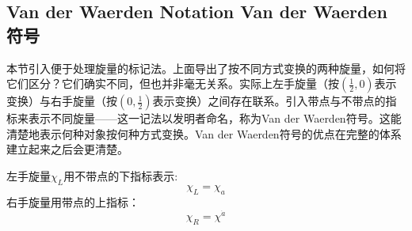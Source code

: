 \subsection[Van der Waerden 符号]{Van der Waerden Notation \quad Van der Waerden 符号}
\label{sec3.7.7}
本节引入便于处理旋量的标记法。上面导出了按不同方式变换的两种旋量，如何将它们区分？它们确实不同，但也并非毫无关系。实际上左手旋量（按$(\frac{1}{2}, 0)$表示变换）与右手旋量（按$(0, \frac{1}{2})$表示变换）之间存在联系。引入带点与不带点的指标来表示不同旋量——这一记法以发明者命名，称为Van der Waerden符号。这能清楚地表示何种对象按何种方式变换。Van der Waerden符号的优点在完整的体系建立起来之后会更清楚。

左手旋量$\chi_L$用不带点的下指标表示:
\begin{equation}
\label{equ3.188}
	\chi_L = \chi_a
\end{equation}
右手旋量用带点的上指标：
\begin{equation}
\label{equ3.189}
	\chi_R = \chi^{\dot{a}}
\end{equation}

